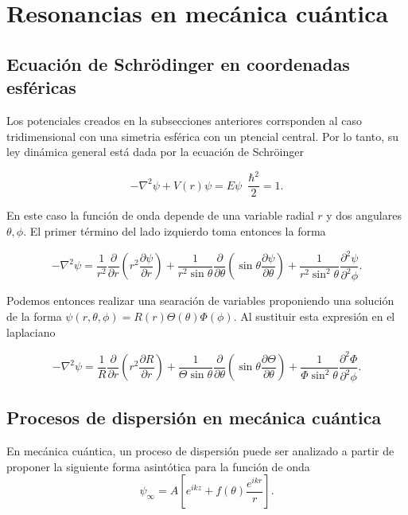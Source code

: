 \chapter{Resonancias en mecánica cuántica}

\section{Ecuación de Schrödinger en coordenadas esféricas}

Los potenciales creados en la subsecciones anteriores corrsponden al caso tridimensional con una simetria esférica con un ptencial central. Por lo tanto, su ley dinámica general está dada por la ecuación de Schröinger

\begin{equation*}
-\nabla^2 \psi + V(r) \psi = E \psi \,\,\, \frac{\hbar^2}{2}= 1.
\end{equation*}

En este caso la función de onda depende de una variable radial $r$ y dos angulares $\theta, \phi$. El primer término del lado izquierdo toma entonces la forma

\begin{equation*}
-\nabla^2 \psi = \frac{1}{r^2} \frac{\partial}{\partial r} \left(r^2 \frac{\partial \psi}{\partial r} \right) + \frac{1}{r^2 \sin \theta} \frac{\partial}{\partial \theta} \left(\sin \theta \frac{\partial \psi}{\partial \theta} \right) +  \frac{1}{r^2 \sin^2 \theta} \frac{\partial^2 \psi}{\partial^2 \phi}.
\end{equation*}

Podemos entonces realizar una searación de variables proponiendo una solución de la forma $\psi(r, \theta, \phi)= R(r)\Theta(\theta)\Phi(\phi)$. Al sustituir esta expresión en el laplaciano

\begin{equation*}
-\nabla^2 \psi = \frac{1}{R} \frac{\partial}{\partial r} \left(r^2\frac{\partial R}{\partial r} \right) + \frac{1}{\Theta \sin \theta} \frac{\partial}{\partial \theta} \left(\sin \theta \frac{\partial \Theta}{\partial \theta} \right) +  \frac{1}{\Phi\sin^2 \theta} \frac{\partial^2 \Phi}{\partial^2 \phi}.
\end{equation*}

\section{Procesos de dispersión en mecánica cuántica}

En mecánica cuántica, un proceso de dispersión puede ser analizado a partir de proponer la siguiente forma asintótica para la función de onda
\begin{equation}
	\psi_{\infty} = A \left[e^{i k z} + f(\theta)  \frac{e^{i k r}}{r} \right]. \label{FAD}
\end{equation}

